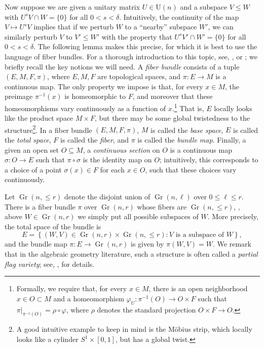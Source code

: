 \documentclass{toc}
\theoremstyle{plain}
\numberwithin{equation}{section}
\theoremstyle{definition}
\DeclareMathOperator\Gr{Gr}
\newcommand{\U}{\mathrm{U}}
\begin{document}
Now suppose we are given a unitary matrix $U\in \U(n)$ and a subspace $V \leq W$ with $U^s V \cap W = \{0\}$ for all $0<s<\delta$. Intuitively, the continuity of the map $V \mapsto U^s V$ implies that if we perturb $W$ to a ``nearby'' subspace $W'$, we can similarly perturb $V$ to $V' \leq W'$ with the property that $U^s V' \cap W' =\{0\}$ for all $0<s<\delta$. The following lemma makes this precise, for which it is best to use the language of fiber bundles. For a thorough introduction to this topic, see, \eg,  \cite{cohen_notes} or \cite[Section III.9]{KMS_books}; we briefly recall the key notions we will need. A \emph{fiber bundle} consists of a tuple $(E,M,F,\pi)$, where $E,M,F$ are topological spaces, and $\pi:E \to M$ is a continuous map. The only property we impose is that, for every $x \in M$, the preimage $\pi^{-1}(x)$ is homeomorphic to $F$, and moreover that these homeomorphisms 
%
vary continuously
%
as a function of $x$.\footnote{Formally, we require that, for every $x \in M$, there is an open neighborhood $x \in O \subset M$ and a homeomorphism $\varphi_U:\pi^{-1}(O) \to O \times F$ such that $\pi|_{\pi^{-1}(O)} = \rho \circ \varphi$, where $\rho$ denotes the standard projection $O \times F \to O$.} That is, $E$ 
%
locally looks like
%
the product space $M \times F$, but there may be some global 
%
twistedness
%
to the structure\footnote{A good intuitive example to keep in mind is the M\"obius strip, which locally looks like a cylinder $S^1 \times [0,1]$, but has a global twist.}. 
In a fiber bundle $(E,M,F,\pi)$, $M$ is called the \emph{base space}, $E$ is called the \emph{total space}, $F$ is called the \emph{fiber}, and $\pi$ is called the \emph{bundle map}. Finally, a given an open set $O \subseteq M$, a \emph{continuous section} on $O$ is a continuous map $\sigma:O \to E$ such that $\pi \circ \sigma$ is the identity map on $O$; intuitively, this corresponds to a choice of a point $\sigma(x) \in F$ for each $x \in O$, such that these choices 
%
vary continuously.
%

Let $\Gr(n,{\leq r})$ denote the disjoint union of $\Gr(n,\ell)$ over $0 \leq \ell \leq r$. There is a fiber bundle $\pi$ over $\Gr(n,r)$ whose fibers are $\Gr(n,{\leq r})$,
%
\ie,    %
above $W \in \Gr(n,r)$ we simply put all possible subspaces of $W$. More precisely, the total space of the bundle is
\[
    E = \left\{(W,V) \in \Gr(n,r) \times \Gr(n,{\leq r})  : V \text{ is a subspace of } W\right\},
\]
and the bundle map $\pi:E \to \Gr(n,r)$ is given by $\pi(W,V)=W$. We remark that in the algebraic geometry literature, such a structure is often called a \emph{partial flag variety}; see, \eg,  \cite[Example 8.30]{Harris_book} for details.
\end{document}
